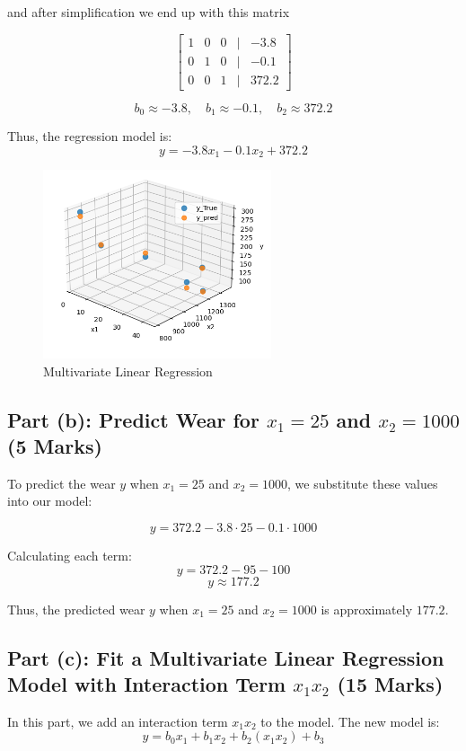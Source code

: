 \documentclass{article}
\begin{document}
	and after simplification we end up with this matrix
	
	\[
	\begin{bmatrix}
		1 & 0 & 0 & \vert & -3.8\\
		0 & 1 & 0 & \vert & -0.1\\
		0 & 0 & 1 & \vert & 372.2
	\end{bmatrix}
	\]
	
	\[
	b_0 \approx -3.8, \quad b_1 \approx -0.1, \quad b_2 \approx 372.2
	\]
	
	Thus, the regression model is:
	\[
	y = - 3.8 x_1 - 0.1 x_2 + 372.2
	\]
	
	\begin{figure}[h!]
		\centering
		\includegraphics[width=0.6\textwidth]{./images/task2a_output.png}
		\caption{Multivariate Linear Regression}
		\label{fig:image2}
	\end{figure}
	
	
	\subsection*{Part (b): Predict Wear for \( x_1 = 25 \) and \( x_2 = 1000 \) (5 Marks)}
	To predict the wear \( y \) when \( x_1 = 25 \) and \( x_2 = 1000 \), we substitute these values into our model:
	
	\[
	y = 372.2 - 3.8 \cdot 25 - 0.1 \cdot 1000
	\]
	
	Calculating each term:
	\[
	y = 372.2 - 95 - 100
	\]
	\[
	y \approx 177.2
	\]
	
	Thus, the predicted wear \( y \) when \( x_1 = 25 \) and \( x_2 = 1000 \) is approximately \( 177.2 \).
	
	 \subsection*{Part (c): Fit a Multivariate Linear Regression Model with Interaction Term \( x_1 x_2 \) (15 Marks)}
	In this part, we add an interaction term \( x_1 x_2 \) to the model. The new model is:
	\[
	y = b_0 x_1 + b_1 x_2 + b_2 (x_1 x_2) + b_3
	\]
	
\end{document}
